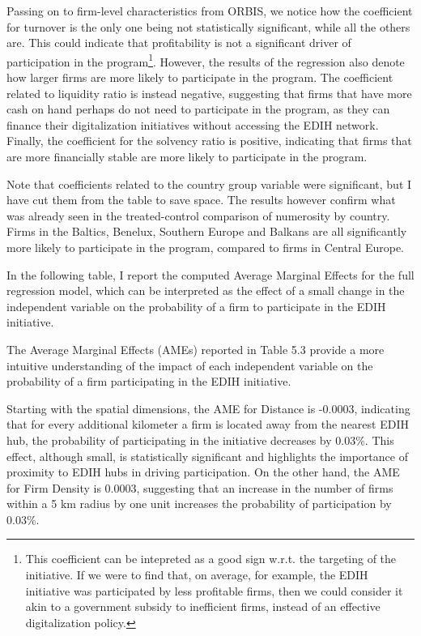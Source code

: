 \documentclass[12pt]{report}
\begin{document}
\par Passing on to firm-level characteristics from ORBIS, we notice how the coefficient for turnover is the only one being not statistically significant, while all the others are. This could indicate that profitability is not a significant driver of participation in the program\footnote{This coefficient can be intepreted as a good sign w.r.t. the targeting of the initiative. If we were to find that, on average, for example, the EDIH initiative was participated by less profitable firms, then we could consider it akin to a government subsidy to inefficient firms, instead of an effective digitalization policy.}. However, the results of the regression also denote how larger firms are more likely to participate in the program. The coefficient related to liquidity ratio is instead negative, suggesting that firms that have more cash on hand perhaps do not need to participate in the program, as they can finance their digitalization initiatives without accessing the EDIH network. Finally, the coefficient for the solvency ratio is positive, indicating that firms that are more financially stable are more likely to participate in the program.

\par Note that coefficients related to the country group variable were significant, but I have cut them from the table to save space. The results however confirm what was already seen in the treated-control comparison of numerosity by country. Firms in the Baltics, Benelux, Southern Europe and Balkans are all significantly more likely to participate in the program, compared to firms in Central Europe.

\par In the following table, I report the computed Average Marginal Effects for the full regression model, which can be interpreted as the effect of a small change in the independent variable on the probability of a firm to participate in the EDIH initiative.

\par The Average Marginal Effects (AMEs) reported in Table 5.3 provide a more intuitive understanding of the impact of each independent variable on the probability of a firm participating in the EDIH initiative. 

\par Starting with the spatial dimensions, the AME for Distance is -0.0003, indicating that for every additional kilometer a firm is located away from the nearest EDIH hub, the probability of participating in the initiative decreases by 0.03\%. This effect, although small, is statistically significant and highlights the importance of proximity to EDIH hubs in driving participation. On the other hand, the AME for Firm Density is 0.0003, suggesting that an increase in the number of firms within a 5 km radius by one unit increases the probability of participation by 0.03\%.
\end{document}
